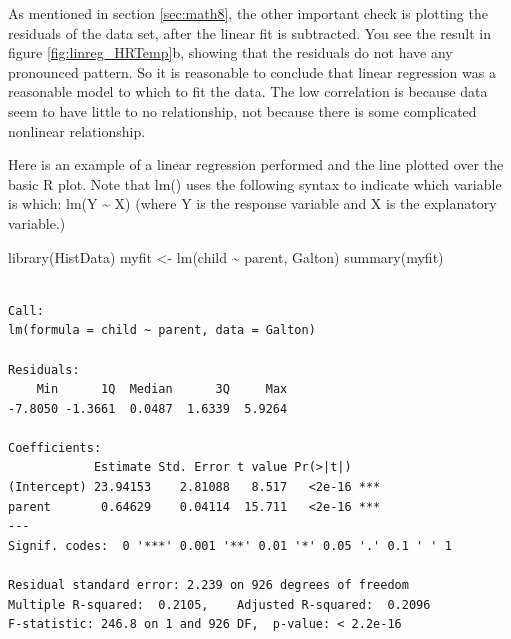 \documentclass[
  letterpaper,
  DIV=11,
  numbers=noendperiod]{scrreprt}
\newenvironment{Shaded}{\begin{snugshade}}{\end{snugshade}}
\newcommand{\DecValTok}[1]{\textcolor[rgb]{0.68,0.00,0.00}{#1}}
\newcommand{\FunctionTok}[1]{\textcolor[rgb]{0.28,0.35,0.67}{#1}}
\newcommand{\NormalTok}[1]{\textcolor[rgb]{0.00,0.23,0.31}{#1}}
\newcommand{\OtherTok}[1]{\textcolor[rgb]{0.00,0.23,0.31}{#1}}
\newcommand{\SpecialCharTok}[1]{\textcolor[rgb]{0.37,0.37,0.37}{#1}}
\newcommand{\StringTok}[1]{\textcolor[rgb]{0.13,0.47,0.30}{#1}}
\begin{document}
As mentioned in section \ref{sec:math8}, the other important check is
plotting the residuals of the data set, after the linear fit is
subtracted. You see the result in figure \ref{fig:linreg_HRTemp}b,
showing that the residuals do not have any pronounced pattern. So it is
reasonable to conclude that linear regression was a reasonable model to
which to fit the data. The low correlation is because data seem to have
little to no relationship, not because there is some complicated
nonlinear relationship.

Here is an example of a linear regression performed and the line plotted
over the basic R plot. Note that lm() uses the following syntax to
indicate which variable is which: lm(Y \textasciitilde{} X) (where Y is
the response variable and X is the explanatory variable.)

\begin{Shaded}
\begin{Highlighting}[]
\FunctionTok{library}\NormalTok{(HistData)}
\NormalTok{myfit }\OtherTok{\textless{}{-}} \FunctionTok{lm}\NormalTok{(child }\SpecialCharTok{\textasciitilde{}}\NormalTok{ parent, Galton) }
\FunctionTok{summary}\NormalTok{(myfit)}
\end{Highlighting}
\end{Shaded}

\begin{verbatim}

Call:
lm(formula = child ~ parent, data = Galton)

Residuals:
    Min      1Q  Median      3Q     Max 
-7.8050 -1.3661  0.0487  1.6339  5.9264 

Coefficients:
            Estimate Std. Error t value Pr(>|t|)    
(Intercept) 23.94153    2.81088   8.517   <2e-16 ***
parent       0.64629    0.04114  15.711   <2e-16 ***
---
Signif. codes:  0 '***' 0.001 '**' 0.01 '*' 0.05 '.' 0.1 ' ' 1

Residual standard error: 2.239 on 926 degrees of freedom
Multiple R-squared:  0.2105,    Adjusted R-squared:  0.2096 
F-statistic: 246.8 on 1 and 926 DF,  p-value: < 2.2e-16
\end{verbatim}

\begin{Shaded}
\end{Shaded}
\end{document}
